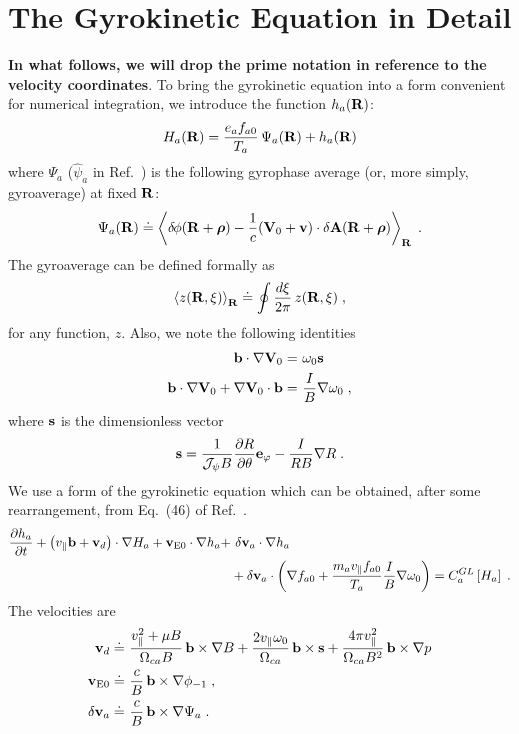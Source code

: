 \section{The Gyrokinetic Equation in Detail}

{\bf In what follows, we will drop the prime notation in reference 
to the velocity coordinates}. To bring the gyrokinetic equation into 
a form convenient for numerical integration, we introduce the 
function $h_a(\mathbf{R})$:
%
\begin{equation}
H_a(\mathbf{R}) = \frac{e_a f_{a0}}{T_a} \, \Psi_a(\mathbf{R}) + h_a(\mathbf{R})
\label{eq.bigh}
\end{equation}
%
where $\Psi_a$ (${\hat\psi}_a$ in Ref.~\cite{sugama:1998}) is the 
following gyrophase average (or, more simply, gyroaverage) at 
fixed $\mathbf{R}$:
%
\begin{equation}
\Psi_a(\mathbf{R}) \doteq \left< 
\delta \hskip -1pt \phi(\mathbf{R}+\boldsymbol{\rho})-\frac{1}{c}({\bf V}_0 + \mathbf{v}) \cdot 
\delta {\bf A}(\mathbf{R}+\boldsymbol{\rho}) \right>_{\mathbf{R}} \; .
\label{eq.bigpsi}
\end{equation}
%
The gyroaverage can be defined formally as
%
\begin{equation}
\left< z(\mathbf{R},\xi) \right>_{\mathbf{R}} \doteq \oint \frac{d\xi}{2\pi} \, z(\mathbf{R},\xi) \; ,
\label{eq.gyroav}
\end{equation}
%
for any function, $z$.    Also, we note 
the following identities 
%
\begin{align}
\mathbf{b} \cdot\nabla \mathbf{V}_0 = &~\omega_0 \mathbf{s} \\
\mathbf{b} \cdot\nabla \mathbf{V}_0 + \nabla \mathbf{V}_0 \cdot \mathbf{b} = &~ 
 \frac{I}{B} \nabla \omega_0 \; ,
\end{align}
%
where $\mathbf{s}$ is the dimensionless vector 
%
\begin{equation}
\mathbf{s} = \frac{1}{\mathcal{J_\psi} B} \frac{\partial R}{\partial\theta} \mathbf{e}_\varphi 
- \frac{I}{RB} \nabla R \; .
\end{equation}
%
We use a form of the gyrokinetic equation which can be obtained, 
after some rearrangement, from Eq.~(46) of Ref.~\cite{sugama:1998}.
%
\begin{align}
\frac{\partial h_a}{\partial t} + \left( v_\parallel \mathbf{b} + \mathbf{v}_d \right)
\cdot\nabla H_a + {\bf v}_{\rm E0} \cdot \nabla h_a 
+ &~\delta {\bf v}_a \cdot \nabla h_a \nonumber\\
& + \delta {\bf v}_a \cdot \left( \nabla f_{a0} + 
 \frac{m_a v_\parallel f_{a0}}{T_a} \frac{I}{B} \nabla \omega_0 \right) 
 = C_a^{GL}\left[ H_a \right] \; .
\label{eq.gkraw}
\end{align}
%
The velocities are  
%
\begin{align}
\mathbf{v}_d \doteq &~\frac{v_\parallel^2+\mu B}{\Omega_{ca} B} \, \mathbf{b} \times\nabla B
+ \frac{2 v_\parallel \omega_0}{\Omega_{ca}} \, \mathbf{b} \times \mathbf{s} 
 + \frac{4\pi v_\parallel^2}{\Omega_{ca} B^2} \, \mathbf{b} \times \nabla p \\
{\bf v}_{\rm E0} \doteq &~\frac{c}{B} \, \mathbf{b}\times\nabla\phi_{-1}\; , \\
\delta {\bf v}_a \doteq &~\frac{c}{B} \, \mathbf{b}\times\nabla\Psi_a \; .
\end{align}
